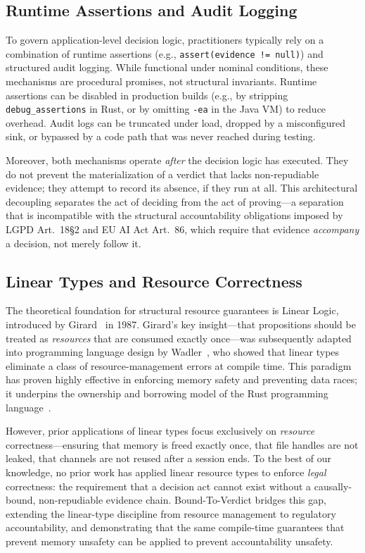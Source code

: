 \subsection{Runtime Assertions and Audit Logging}
\label{sec:runtime}

To govern application-level decision logic, practitioners
typically rely on a combination of runtime assertions
(e.g., \texttt{assert(evidence != null)}) and structured
audit logging.
While functional under nominal conditions, these mechanisms are
procedural promises, not structural invariants.
Runtime assertions can be disabled in production builds
(e.g., by stripping \texttt{debug\_assertions} in Rust, or by
omitting \texttt{-ea} in the Java VM) to reduce overhead.
Audit logs can be truncated under load, dropped by a misconfigured
sink, or bypassed by a code path that was never reached during
testing.

Moreover, both mechanisms operate \emph{after} the decision logic
has executed.
They do not prevent the materialization of a verdict that lacks
non-repudiable evidence; they attempt to record its absence, if they
run at all.
This architectural decoupling separates the act of deciding from the
act of proving---a separation that is incompatible with the
structural accountability obligations imposed by LGPD Art.~18\S2 and
EU AI Act Art.~86, which require that evidence \emph{accompany} a
decision, not merely follow it.

\subsection{Linear Types and Resource Correctness}
\label{sec:linear_related}

The theoretical foundation for structural resource guarantees is
Linear Logic, introduced by Girard~\cite{girard1987linear} in 1987.
Girard's key insight---that propositions should be treated as
\emph{resources} that are consumed exactly once---was subsequently
adapted into programming language design by
Wadler~\cite{wadler1991linear}, who showed that linear types
eliminate a class of resource-management errors at compile time.
This paradigm has proven highly effective in enforcing memory safety
and preventing data races; it underpins the ownership and borrowing
model of the Rust programming language~\cite{jung2017rustbelt}.

However, prior applications of linear types focus exclusively on
\emph{resource} correctness---ensuring that memory is freed exactly
once, that file handles are not leaked, that channels are not
reused after a session ends.
To the best of our knowledge, no prior work has applied linear
resource types to enforce \emph{legal} correctness: the requirement
that a decision act cannot exist without a causally-bound,
non-repudiable evidence chain.
Bound-To-Verdict bridges this gap, extending the linear-type
discipline from resource management to regulatory accountability,
and demonstrating that the same compile-time guarantees that prevent
memory unsafety can be applied to prevent accountability unsafety.
